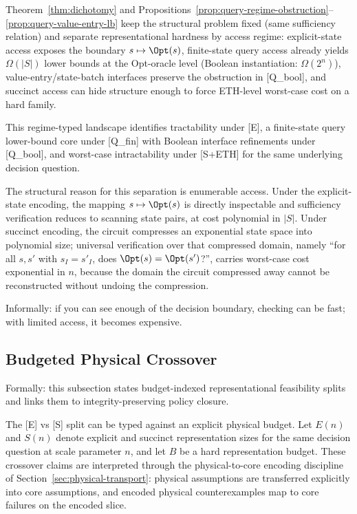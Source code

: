 \begin{remark}
Theorem~\ref{thm:dichotomy} and Propositions~\ref{prop:query-regime-obstruction}--\ref{prop:query-value-entry-lb} keep the structural problem fixed (same sufficiency relation) and separate representational hardness by access regime: explicit-state access exposes the boundary $s \mapsto \Opt(s)$, finite-state query access already yields $\Omega(|S|)$ lower bounds at the Opt-oracle level (Boolean instantiation: $\Omega(2^n)$), value-entry/state-batch interfaces preserve the obstruction in [Q\_bool], and succinct access can hide structure enough to force ETH-level worst-case cost on a hard family.
\end{remark}

This regime-typed landscape identifies tractability under [E], a finite-state query lower-bound core under [Q\_fin] with Boolean interface refinements under [Q\_bool], and worst-case intractability under [S+ETH] for the same underlying decision question.

The structural reason for this separation is enumerable access. Under the explicit-state encoding, the mapping $s \mapsto \Opt(s)$ is directly inspectable and sufficiency verification reduces to scanning state pairs, at cost polynomial in $|S|$. Under succinct encoding, the circuit compresses an exponential state space into polynomial size; universal verification over that compressed domain, namely ``for all $s, s'$ with $s_I = s'_I$, does $\Opt(s) = \Opt(s')$?'', carries worst-case cost exponential in $n$, because the domain the circuit compressed away cannot be reconstructed without undoing the compression.

Informally: if you can see enough of the decision boundary, checking can be fast; with limited access, it becomes expensive.

\subsection{Budgeted Physical Crossover}
Formally: this subsection states budget-indexed representational feasibility splits and links them to integrity-preserving policy closure.

The [E] vs [S] split can be typed against an explicit physical budget. Let $E(n)$ and $S(n)$ denote explicit and succinct representation sizes for the same decision question at scale parameter $n$, and let $B$ be a hard representation budget.
These crossover claims are interpreted through the physical-to-core encoding discipline of Section~\ref{sec:physical-transport}: physical assumptions are transferred explicitly into core assumptions, and encoded physical counterexamples map to core failures on the encoded slice.

